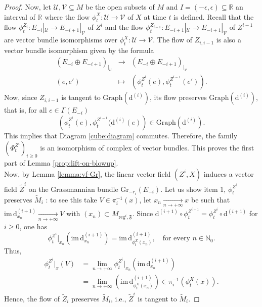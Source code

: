 \documentclass[10pt]{article}
\theoremstyle{plain}
\theoremstyle{definition}
\theoremstyle{remark}
\newcommand{\dd}{\mathrm{d}}
\begin{document}
\begin{proof}
Now, let $\mathcal U,\mathcal{V}\subseteq M$ be the open subsets of $M$ and $I=(-\epsilon,\epsilon)\subseteq \mathbb R$ an interval of $\mathbb R$ where the flow $\phi_t^X\colon \mathcal{U}\to \mathcal{ V}$ of $X$ at time $t$ is defined. 
Recall that the flow  $\phi_t^{Z_i}\colon E_{-i}|_{\mathcal{U}} \to E_{-i+1}|_{\mathcal{V}}$ of $Z^i$ and the flow $\phi_t^{Z_{i-1}} \colon E_{-i+1}|_\mathcal{U} \to E_{-i+1}|_{\mathcal V
}$ of $Z^{i-1}$  are vector bundle isomorphisms  over $\phi_t^X\colon \mathcal{U}\to \mathcal{V}$.
The flow of $Z_{i,i-1}$ is also a vector bundle isomorphism given by the formula 
 $$  \begin{array}{rcl} (E_{-i} \oplus E_{-i+1})_{|_{\mathcal U}} & \to   &  (E_{-i} \oplus E_{-i+1})_{|_{\mathcal V}} \\  (e,e') & \mapsto  & \left(\phi_t^{Z^i}(e), \phi_t^{Z^{i-1}}(e')\right).\end{array}$$
Now, since $Z_{i,i-1}$ is tangent to $\mathrm{Graph}(\dd^{(i)})$, its flow preserves $\mathrm{Graph}(\dd^{(i)})$, that is, for all $e\in \Gamma(E_{-i})$ $$\left(\phi_t^{Z^i}(e), \phi_t^{Z^{i-1}}(\dd^{(i)}(e)\right)\in \mathrm{Graph}(\dd^{(i)}).$$ This implies that Diagram \eqref{cube:diagram} commutes. Therefore, the family $\left(\Phi^{Z^i}_t\right)_{i\geq 0}$ is an isomorphism of complex of vector bundles. This proves the first part of Lemma \ref{prop:lift-on-blowup}.\\


Now, by Lemma \ref{lemma:vf-Gr}, the linear vector field $(Z^i,X)$ induces a vector field  $\widetilde Z^i$ on the Grassmannian  bundle $\mathrm{Gr}_{-r_i}(E_{-i})$. Let us show item 1, $\phi^{Z^i}_t$ preserves $\widetilde M_i$ : to see this take $V\in\pi_i^{-1}(x)$,  let $x_n\underset{n \to +\infty}{\longrightarrow}x$ be such that $\mathrm{im}\,{\dd}^{(i+1)}_{x_n}\underset{n \to +\infty}{\longrightarrow} V$ with $(x_n)\subset{M_{\mathrm{reg}^{i},\mathfrak F}}$. Since $\dd^{(i+1)}\circ\phi_t^{Z^{i+1}}=\phi_t^{Z^{i}}\circ\dd^{(i+1)}$ for $i\geq 0$, one has  $$\phi_t^{Z^i}|_{x_n}\left(\mathrm{im}\,{ \dd}^{(i+1)}_{x_n}\right)=\mathrm{im}\,{\dd}^{(i+1)}_{\phi^X_t(x_n)},\quad \text{for every $n\in\mathbb{N}_0$}.$$ Thus, 
\begin{align*}
    \phi_t^{Z^i}|_x(V)&=\lim_{n\rightarrow +\infty}\phi_t^{Z^i}|_{x_n}\left(\mathrm{im}\,\dd^{(i+1)}_{x_n}\right)\\&=\lim_{n\rightarrow +\infty}\left(\mathrm{im}\,{\dd}^{(i+1)}_{\phi^X_t(x_n)}\right)\in \pi_i^{-1}\left(\phi^X_t(x)\right).
\end{align*}
Hence, the flow of $\widetilde Z_i$ preserves $\widetilde M_i$, i.e.,  ${\widetilde Z}^i$ is tangent to $\widetilde M_i$.%
\end{proof}
\end{document}
